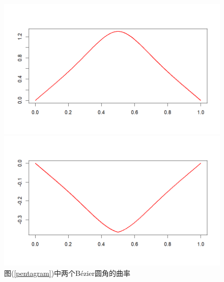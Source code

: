 \documentclass[utf8]{ctexart} %
\numberwithin{figure}{section}
\numberwithin{equation}{section}
\begin{document}
\begin{figure}
	\centering
	\begin{minipage}{0.49\linewidth}
		\centering
		\includegraphics[width=0.7\linewidth]{figures/Pentagram_Bezier1.png}
	\end{minipage}
	\begin{minipage}{0.49\linewidth}
		\centering
		\includegraphics[width=0.7\linewidth]{figures/Pentagram_Bezier2.png}
	\end{minipage}
\caption{\small{图(\ref{pentagram})中两个B\'ezier圆角的曲率}}
\end{figure}
\end{document}
